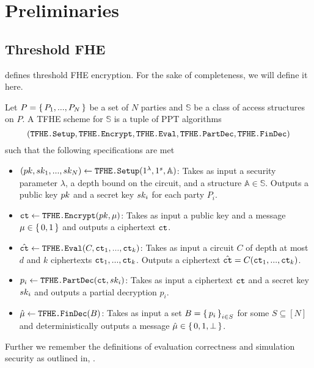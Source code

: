 \section{Preliminaries}
\subsection{Threshold FHE}
\cite{jain2017threshold} defines threshold FHE encryption. For the sake of completeness, we will define it here.

\begin{definition}[TFHE]
	Let $P = \set{P_1, ..., P_N}$	 be a set of $N$ parties and $\mathbb{S}$ be a class of
	access structures on $P$. A TFHE scheme for $\mathbb{S}$ is a tuple of PPT algorithms
	$$
		(\texttt{TFHE.Setup}, \texttt{TFHE.Encrypt}, \texttt{TFHE.Eval}, \texttt{TFHE.PartDec}, \texttt{TFHE.FinDec})
	$$ such that the following specifications are met

	\begin{itemize}
		\item $(pk, sk_1, ..., sk_N) \gets \texttt{TFHE.Setup}(1^\lambda, 1^s, \mathbb{A})$:
		      Takes as input a security parameter $\lambda$, a depth bound on the circuit, and a structure $\mathbb{A} \in \mathbb{S}$.
		      Outputs a public key $pk$ and a secret key $sk_i$ for each party $P_i$.
		\item $\texttt{ct} \gets \texttt{TFHE.Encrypt}(pk, \mu)$: Takes as input a public key and a message $\mu \in \set{0, 1}$ and outputs a ciphertext $\texttt{ct}$.
		\item $\hat{\texttt{ct}} \gets \texttt{TFHE.Eval}(C, \texttt{ct}_1, ..., \texttt{ct}_k)$: Takes as input a circuit $C$ of depth at most $d$ and $k$ ciphertexts $\texttt{ct}_1, ..., \texttt{ct}_k$.
		      Outputs a ciphertext $\hat{\texttt{ct}} = C(\texttt{ct}_1, ..., \texttt{ct}_k)$.
		\item $p_i \gets \texttt{TFHE.PartDec}(\texttt{ct}, sk_i)$: Takes as input a ciphertext $\texttt{ct}$ and a secret key $sk_i$ and outputs a partial decryption $p_i$.
		\item $\hat\mu \gets \texttt{TFHE.FinDec}(B)$: Takes as input a set $B = \set{p_i}_{i \in S}$ for some $S \subseteq [N]$ and deterministically
		      outputs a message $\hat\mu \in \set{0, 1, \bot}$.
	\end{itemize}
\end{definition}

Further we remember the definitions of evaluation correctness and simulation security as outlined in,
\cite{boneh2020single}.


